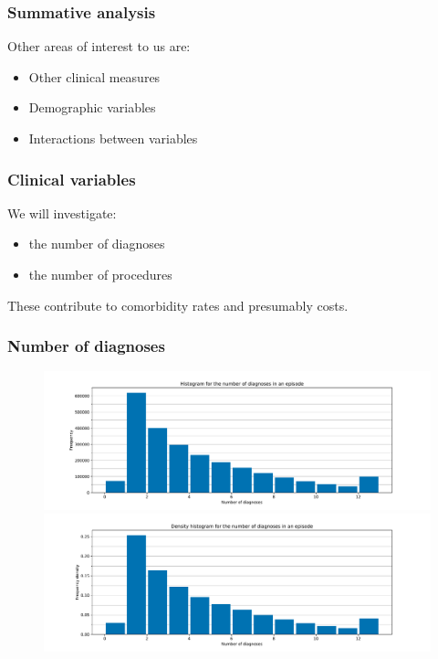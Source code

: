 \documentclass{beamer}
\begin{document}
\begin{frame}
    \frametitle{Summative analysis}

    Other areas of interest to us are:
    \begin{itemize}
        \item Other clinical measures
        \item Demographic variables
        \item Interactions between variables
    \end{itemize}
\end{frame}

\begin{frame}
    \frametitle{Clinical variables}

    We will investigate:
    \begin{itemize}
        \item the number of diagnoses
        \item the number of procedures
    \end{itemize}

    \pause%
    These contribute to comorbidity rates and presumably costs.
\end{frame}

\begin{frame}
    \frametitle{Number of diagnoses}
   
    \begin{figure}
        \begin{minipage}{\linewidth}
            \includegraphics[width=\linewidth]{./img/diag_no_freq_hist.pdf}
        \end{minipage}
        \begin{minipage}{\linewidth}
            \includegraphics[width=\linewidth]{./img/diag_no_density_hist.pdf}
        \end{minipage}
    \end{figure}
\end{frame}
\end{document}
